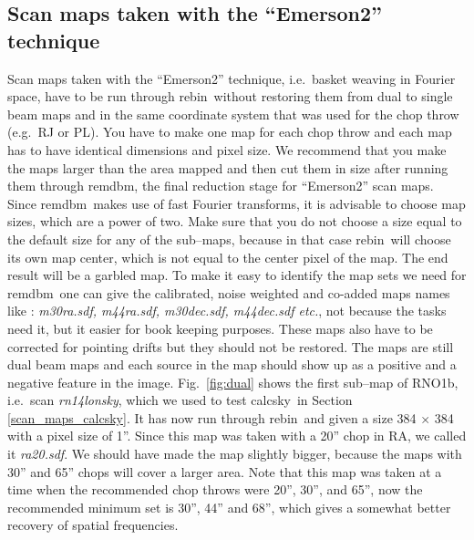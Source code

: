 \documentclass[twoside,11pt]{article}
\newcommand{\task}[1]{\textsf{#1}}
\newcommand{\rebin}{\xref{\task{rebin}}{sun216}{REBIN}}
\newcommand{\remdbm}{\xref{\task{remdbm}}{sun216}{REMDBM}}
\newcommand{\calcsky}{\xref{\task{calcsky}}{sun216}{CALCSKY}}
\newcommand{\xref}[3]{#1}
\newcommand{\xlabel}[1]{}
\renewcommand{\_}{\texttt{\symbol{95}}}
\begin{document}
\subsection{\xlabel{Emerson2_maps}Scan maps taken with the 
``Emerson2''
technique}

Scan maps taken with the ``Emerson2'' technique, i.e.\ basket weaving
in Fourier space, have to be run through \rebin\ without restoring
them from dual to single beam maps and in the same coordinate system
that was used for the chop throw (e.g.\ RJ or PL).  You have to make
one map for each chop throw and each map has to have identical
dimensions and pixel size.  We recommend that you make the maps larger
than the area mapped and then cut them in size after running them
through \remdbm, the final reduction stage for ``Emerson2'' scan maps. 
Since \remdbm\ makes use of fast Fourier transforms, it is advisable
to choose map sizes, which are a power of two.  Make sure that you do
not choose a size equal to the default size for any of the sub--maps,
because in that case \rebin\ will choose its own map center, which is
not equal to the center pixel of the map. The end result will be a
garbled map.  To make it easy to identify the map sets we need for
\remdbm\ one can give the calibrated, noise weighted and co-added maps
names like : {\it m30ra.sdf, m44ra.sdf, m30dec.sdf, m44dec.sdf etc.},
not because the tasks need it, but it easier for book keeping
purposes.  These maps also have to be corrected for pointing drifts
but they should not be restored.  The maps are still dual beam maps
and each source in the map should show up as a positive and a negative
feature in the image.  Fig.\ \ref{fig:dual} shows the first sub--map
of RNO1b, i.e.\ scan {\it rn14\_lon\_sky}, which we used to test
\calcsky\ in Section \ref{scan_maps_calcsky}.  It has now run through
\rebin\ and given a size 384 $\times$ 384 with a pixel size of 1''. 
Since this map was taken with a 20'' chop in RA, we called it {\it
ra20.sdf}.  We should have made the map slightly bigger, because the
maps with 30'' and 65'' chops will cover a larger area.  Note that
this map was taken at a time when the recommended chop throws were
20'', 30'', and 65'', now the recommended minimum set is 30'', 44''
and 68'', which gives a somewhat better recovery of spatial
frequencies.
\end{document}
